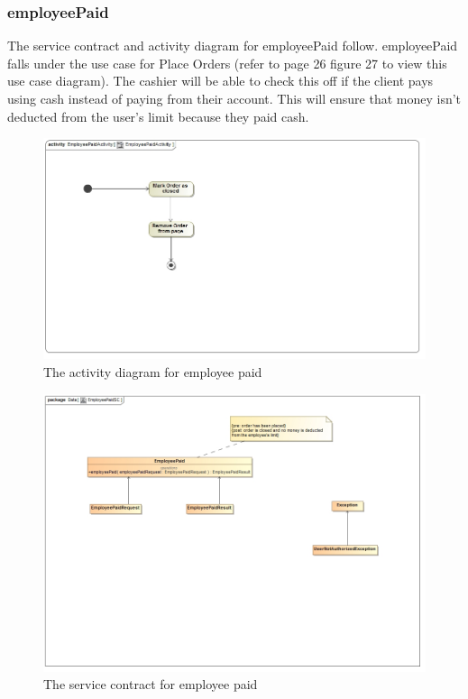 \documentclass[a4paper,12pt]{report}
\begin{document}
\subsubsection{employeePaid}
The service contract and activity diagram for employeePaid follow. employeePaid falls under the use case for Place Orders (refer to page 26 figure 27 to view this use case diagram). The cashier will be able to check this off if the client pays using cash instead of paying from their account. This will ensure that money isn't deducted from the user's limit because they paid cash. 
\begin{figure}[H]
  \centering
    \includegraphics[width=1.0\textwidth]{../images/EmployeePaidActivity.jpg}
    \caption{The activity diagram for employee paid} 
\end{figure}

\begin{figure}[H]
	\centering
	\includegraphics[width=1.0\textwidth]{../images/EmployeePaidSC.jpg}
	\caption{The service contract for employee paid}
\end{figure}
\end{document}

